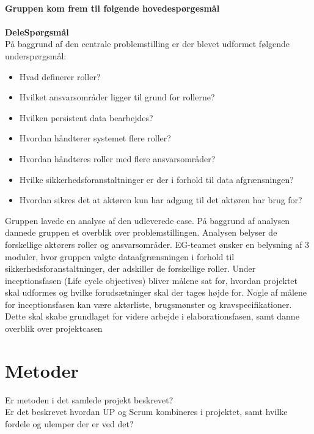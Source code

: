 \textbf{\\Gruppen kom frem til følgende hovedespørgesmål}\\
\noindent{}
 \textbf{\\
DeleSpørgsmål\\}
På baggrund af den centrale problemstilling er der blevet udformet følgende underspørgsmål:\\
\begin{itemize}
\item Hvad definerer roller?
\item Hvilket ansvarsområder ligger til grund for rollerne?
\item Hvilken persistent data bearbejdes?
\item Hvordan håndterer systemet flere roller?
\item Hvordan håndteres roller med flere ansvarsområder?
\item Hvilke sikkerhedsforanstaltninger er der i forhold til data afgrænsningen?
\item Hvordan sikres det at aktøren kun har adgang til det aktøren har brug for? 
\end{itemize}
Gruppen lavede en analyse af den udleverede case. På baggrund af analysen dannede gruppen et overblik over problemstillingen. Analysen belyser de forskellige aktørers roller og ansvarsområder. EG-teamet ønsker en belysning af 3 moduler, hvor gruppen valgte dataafgrænsningen i forhold til sikkerhedsforanstaltninger, der adskiller de forskellige roller. 
Under inceptionsfasen (Life cycle objectives) bliver målene sat for, hvordan projektet skal udformes og hvilke forudsætninger skal der tages højde for. Nogle af målene for inceptionsfasen kan være aktørliste, brugsmønster og kravspecifikationer. 
Dette skal skabe grundlaget for videre arbejde i elaborationsfasen, samt danne overblik over projektcasen



\section{Metoder}
Er metoden i det samlede projekt beskrevet?\\
Er det beskrevet hvordan UP og Scrum kombineres i projektet, samt hvilke fordele og ulemper der er ved det?\\

